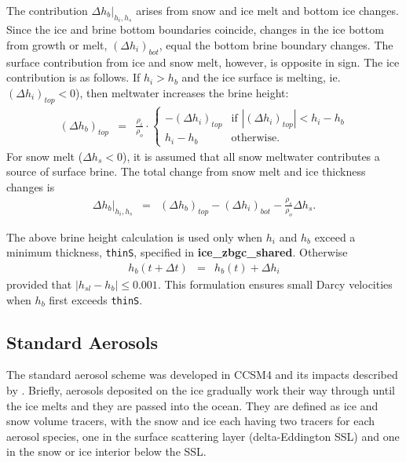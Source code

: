 The contribution $\Delta h_b|_{h_i,h_s}$ arises from snow and ice
melt and bottom ice changes.  Since the ice and brine bottom
boundaries coincide, changes in the ice bottom from growth or melt,
$(\Delta h_i)_{bot}$, equal the bottom brine boundary changes.  The surface
contribution from ice and snow melt, however, is opposite in
sign. The ice contribution is as follows. If $h_i > h_b$ and the ice
surface is melting, ie. $(\Delta h_i)_{top} <
0$), then meltwater increases the brine height:
\begin{eqnarray}
\left(\Delta h_b\right)_{top} & = &  \frac{\rho_i}{\rho_o} \cdot \left\{ \begin{array}{ll}
 -(\Delta h_i)_{top} &  \mbox{if }
 |(\Delta h_i)_{top}| < h_i-h_b  \\
 h_i-h_b & \mbox{otherwise.}   \end{array} \right.
\end{eqnarray}
For snow melt ($\Delta h_s < 0$), it is assumed that
all snow meltwater contributes a source of surface
brine. The total change from snow melt and ice thickness changes is
\begin{eqnarray}
\label{eqn:dzdt_meltwater}
\Delta h_b|_{h_i,h_s} & = & \left( \Delta
h_b\right)_{top} -\left(\Delta h_i\right)_{bot} -\frac{\rho_s}{\rho_o}\Delta h_s.
\end{eqnarray}

The above brine height calculation is used only when $h_i$ and $h_b$
exceed a minimum thickness, {\tt thinS}, specified in {\bf
  ice\_zbgc\_shared}. Otherwise 
\begin{eqnarray}
\label{eqn:thinbrine}
h_b(t+\Delta t) & = & h_b(t) + \Delta h_i
\end{eqnarray}
provided that $|h_{sl}-h_b| \leq 0.001$.  This
formulation ensures small Darcy velocities
 when $h_b$ first exceeds {\tt thinS}.

\subsection{Standard Aerosols}

 The standard aerosol scheme was developed in
CCSM4 and its impacts described by \cite{Holland:dust:2012}. Briefly,  aerosols deposited on the ice gradually
work their way through until the ice melts and they are passed
into the ocean.   They are defined as ice and snow volume tracers, with the
snow and ice each having two  tracers for each aerosol species, one in
the surface scattering layer (delta-Eddington SSL) and one in the snow or ice interior below the SSL.

